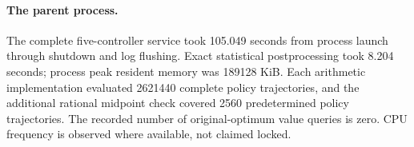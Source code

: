 \paragraph{The parent process.}
The complete five-controller service took 105.049 seconds from process launch through shutdown and log flushing. Exact statistical postprocessing took 8.204 seconds; process peak resident memory was 189128 KiB. Each arithmetic implementation evaluated 2621440 complete policy trajectories, and the additional rational midpoint check covered 2560 predetermined policy trajectories. The recorded number of original-optimum value queries is zero. CPU frequency is observed where available, not claimed locked.
